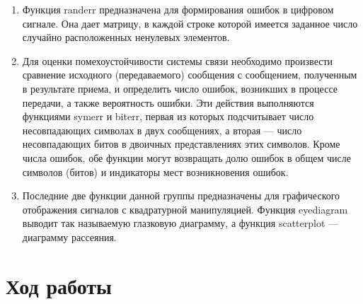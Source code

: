 \begin{enumerate}
\item Функция randerr предназначена для формирования ошибок в цифровом сигнале. Она дает матрицу, в каждой строке которой имеется заданное число случайно расположенных ненулевых элементов.
\item Для оценки помехоустойчивости системы связи необходимо произвести сравнение исходного (передаваемого) сообщения с сообщением, полученным в результате приема, и определить число ошибок, возникших в процессе передачи, а также вероятность ошибки. Эти действия выполняются функциями symerr и biterr, первая из которых подсчитывает число несовпадающих символах в двух сообщениях, а вторая — число несовпадающих битов в двоичных представлениях этих символов. Кроме числа ошибок, обе функции могут возвращать долю ошибок в общем числе символов (битов) и индикаторы мест возникновения ошибок.
\item Последние две функции данной группы предназначены для графического отображения сигналов с квадратурной манипуляцией. Функция eyediagram выводит так называемую глазковую диаграмму, а функция scatterplot — диаграмму рассеяния.
\end{enumerate}

\section{Ход работы}

